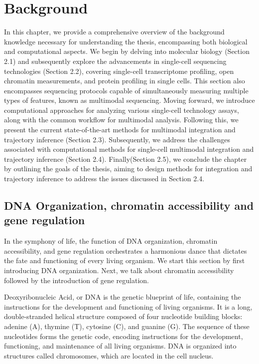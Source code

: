 %
\chapter{Background}
\label{cha:background}
\graphicspath{{chapter2/figs/}}

In this chapter, we provide a comprehensive overview of the background knowledge necessary for understanding the thesis, encompassing both biological and computational aspects. We begin by delving into molecular biology (Section 2.1) and subsequently explore the advancements in single-cell sequencing technologies (Section 2.2), covering single-cell transcriptome profiling, open chromatin measurements, and protein profiling in single cells. This section also encompasses sequencing protocols capable of simultaneously measuring multiple types of features, known as multimodal sequencing. Moving forward, we introduce computational approaches for analyzing various single-cell technology assays, along with the common workflow for multimodal analysis. Following this, we present the current state-of-the-art methods for multimodal integration and trajectory inference (Section 2.3). Subsequently, we address the challenges associated with computational methods for single-cell multimodal integration and trajectory inference (Section 2.4). Finally(Section 2.5), we conclude the chapter by outlining the goals of the thesis, aiming to design methods for integration and trajectory inference to address the issues discussed in Section 2.4.


\section{DNA Organization, chromatin accessibility and gene regulation}
\label{background:DNA_Chromatin_Regulation}
In the symphony of life, the function of DNA organization, chromatin accessibility, and gene regulation orchestrates a harmonious dance that dictates the fate and functioning of every living organism. We start this section by first introducing DNA organization. Next, we talk about chromatin accessibility followed by the introduction of gene regulation.

Deoxyribonucleic Acid, or DNA is the genetic blueprint of life, containing the instructions for the development and functioning of living organisms. It is a long, double-stranded helical structure composed of four nucleotide building blocks: adenine (A), thymine (T), cytosine (C), and guanine (G). The sequence of these nucleotides forms the genetic code, encoding instructions for the development, functioning, and maintenance of all living organisms. DNA is organized into structures called chromosomes, which are located in the cell nucleus. 


